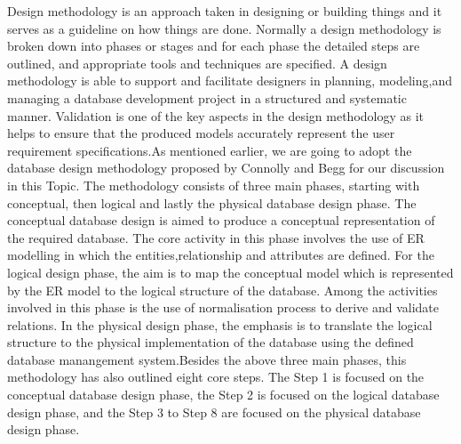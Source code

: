 Design methodology is an approach taken in designing or building things and it serves as a guideline on how things are done. Normally a design methodology is broken down into phases or stages and for each phase the detailed steps are outlined, and appropriate tools and techniques are specified. A design methodology is able to support and facilitate designers in planning, modeling,and managing a database development project in a structured and systematic manner. Validation is one of the key aspects in the design methodology as it helps to ensure that the produced models accurately represent the user
requirement specifications.As mentioned earlier, we are going to adopt the database design methodology proposed by Connolly and Begg for our discussion in this Topic. The methodology consists of three main phases, starting with conceptual, then logical and lastly the physical database design phase. The conceptual database design is aimed to produce a conceptual representation of the required database. The core activity in this phase involves the use of ER modelling in which the entities,relationship and attributes are defined. For the logical design phase, the aim is to map the conceptual model which is represented by the ER model to the logical structure of the database. Among the activities involved in this phase is the use of normalisation process to derive and validate relations. In the physical design phase, the emphasis is to translate the logical structure to the physical implementation of the database using the defined database manangement
system.Besides the above three main phases, this methodology has also outlined eight core steps. The Step 1 is focused on the conceptual database design phase, the Step 2 is focused on the logical database design phase, and the Step 3 to Step 8 are focused on the physical database design phase.  






















































